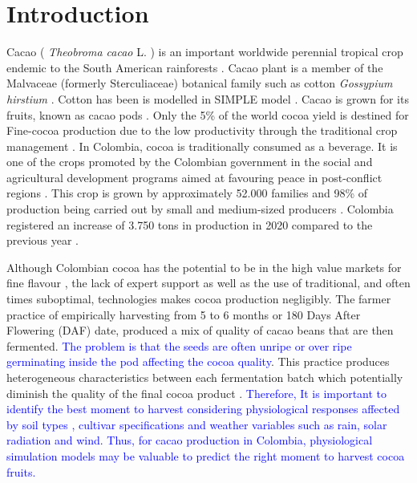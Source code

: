 \documentclass[gene,journal,article,submit,moreauthors,pdftex]{Definitions/mdpi}
\begin{document}

\section{Introduction}

Cacao ( \textit{Theobroma cacao }L. ) is an important worldwide perennial tropical crop endemic to the South American rainforests \citep{zuidema2005, motamayor2002, argout2011, Rodriguez2019}. Cacao plant is a member of the Malvaceae (formerly Sterculiaceae)  botanical family such as  cotton \textit{ Gossypium hirstium} \citep{Nix2017cotton}. Cotton has been is modelled in SIMPLE model \citep{Zao2019simple}. Cacao is grown for its fruits, known as cacao pods \citep{ Niemenak2010, suarez2021}. Only the 5\% of the world cocoa yield is destined for Fine-cocoa production due to the low productivity through  the traditional crop management \citep{argout2011}.  In Colombia, cocoa  is  traditionally  consumed  as  a  beverage. It is one of the crops promoted by the Colombian government in the social and agricultural development  programs aimed at favouring peace in post-conflict regions \citep{Rodriguez2019, Abbott2019}. This crop is grown by approximately 52.000 families \citep{Gutierrez2020} and 98\% of production being carried out by small and medium-sized producers \citep{Garcia2014, Escobar2020}. Colombia registered an increase of 3.750 tons in production in 2020 compared to the previous year \citep{lamos2020}. 

Although Colombian cocoa has the potential to be in the high value markets for fine flavour \citep{Escobar2020}, the lack of expert support as well as the use of traditional, and often times suboptimal, technologies makes cocoa production negligibly. The farmer practice of empirically harvesting from 5 to 6 months or 180 Days After Flowering  (DAF) date, produced a mix of quality of cacao beans that are then fermented. \textcolor{blue}{The problem is that  the seeds are often  unripe or  over ripe germinating inside the pod affecting the cocoa quality}. This practice produces heterogeneous characteristics between each fermentation batch which potentially diminish the quality of the final cocoa product \citep{Escobar2021}.  \textcolor{blue}{Therefore,  It is important to identify the best moment to harvest  considering physiological responses affected by  soil types , cultivar specifications and weather variables such as rain, solar radiation and wind.  Thus,  for cacao production in Colombia, physiological simulation models may be valuable to predict the right moment to harvest cocoa fruits.}
\end{document}
